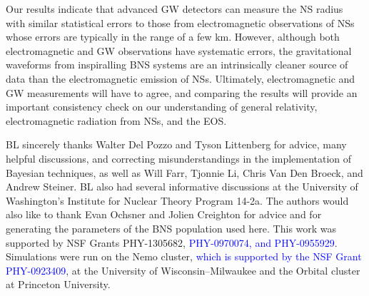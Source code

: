 \documentclass[twocolumn,prd,amssymb,aps,nofootinbib,showpacs,epsf]{revtex4}
\newcommand\les[2]{\textcolor{blue}{{#1}\sout{#2}}}
\begin{document}
Our results indicate that advanced GW detectors can measure the NS radius with similar statistical errors to those from electromagnetic observations of NSs whose errors are typically in the range of a few km. However, although both electromagnetic and GW observations have systematic errors, the gravitational waveforms from inspiralling BNS systems are an intrinsically cleaner source of data than the electromagnetic emission of NSs. Ultimately, electromagnetic and GW measurements will have to agree, and comparing the results will provide an important consistency check on our understanding of general relativity, electromagnetic radiation from NSs, and the EOS.
 
\acknowledgements

BL sincerely thanks Walter Del Pozzo and Tyson Littenberg for advice, many helpful discussions, and correcting misunderstandings in the implementation of Bayesian techniques, as well as Will Farr, Tjonnie Li, Chris Van Den Broeck, and Andrew Steiner. BL also had several informative discussions at the University of Washington's Institute for Nuclear Theory Program 14-2a. The authors would also like to thank Evan Ochsner and Jolien Creighton for advice and for generating the parameters of the BNS population used here. This work was supported by NSF Grants PHY-1305682, \les{PHY-0970074, and PHY-0955929}{}. Simulations were run on the Nemo cluster, \les{which is supported by the NSF Grant PHY-0923409}{}, at the University of Wisconsin--Milwaukee and the Orbital cluster at Princeton University.


\end{document}
